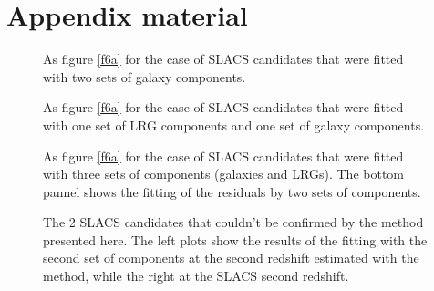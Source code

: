 \documentclass[apj]{emulateapj}
\begin{document}
\appendix

\section{Appendix material}\label{appendix}

\begin{figure}[h]
\caption{As figure \ref{f6a} for the case of SLACS candidates that were fitted with two sets of galaxy components.}
\label{f6}
\end{figure}


\begin{figure}[h]
\caption{As figure \ref{f6a} for the case of SLACS candidates that were fitted with one set of LRG components and one set of galaxy components.}
\label{f7}
\end{figure}

\begin{figure}[h]
\caption{As figure \ref{f6a} for the case of SLACS candidates that were fitted with three sets of components (galaxies and LRGs). The bottom pannel shows the fitting of the residuals by two sets of components.}
\label{f8}
\end{figure}

\begin{figure}[h]
\begin{center}
\caption{The 2 SLACS candidates that couldn't be confirmed by the method presented here. The left plots show the results of the fitting with the second set of components at the second redshift estimated with the method, while the right at the SLACS second redshift.}
\label{f9}
\end{center}
\end{figure}
\end{document}
